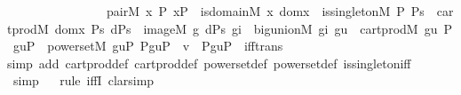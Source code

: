 \begin{isabellebody}
\ \ \ \ \ \ \ \ \ \ \ \ \ \ \ \ pair{\isacharparenleft}{\kern0pt}{\isacharhash}{\kern0pt}{\isacharhash}{\kern0pt}M{\isacharcomma}{\kern0pt}\ x{\isacharcomma}{\kern0pt}\ P{\isacharcomma}{\kern0pt}\ xP{\isacharparenright}{\kern0pt}\ {\isasymand}\ is{\isacharunderscore}{\kern0pt}domain{\isacharparenleft}{\kern0pt}{\isacharhash}{\kern0pt}{\isacharhash}{\kern0pt}M{\isacharcomma}{\kern0pt}\ x{\isacharcomma}{\kern0pt}\ domx{\isacharparenright}{\kern0pt}\ {\isasymand}\ is{\isacharunderscore}{\kern0pt}singleton{\isacharparenleft}{\kern0pt}{\isacharhash}{\kern0pt}{\isacharhash}{\kern0pt}M{\isacharcomma}{\kern0pt}\ P{\isacharcomma}{\kern0pt}\ Ps{\isacharparenright}{\kern0pt}\ {\isasymand}\ cartprod{\isacharparenleft}{\kern0pt}{\isacharhash}{\kern0pt}{\isacharhash}{\kern0pt}M{\isacharcomma}{\kern0pt}\ domx{\isacharcomma}{\kern0pt}\ Ps{\isacharcomma}{\kern0pt}\ dPs{\isacharparenright}{\kern0pt}\ {\isasymand}\ image{\isacharparenleft}{\kern0pt}{\isacharhash}{\kern0pt}{\isacharhash}{\kern0pt}M{\isacharcomma}{\kern0pt}\ g{\isacharcomma}{\kern0pt}\ dPs{\isacharcomma}{\kern0pt}\ gi{\isacharparenright}{\kern0pt}\ {\isasymand}\ big{\isacharunderscore}{\kern0pt}union{\isacharparenleft}{\kern0pt}{\isacharhash}{\kern0pt}{\isacharhash}{\kern0pt}M{\isacharcomma}{\kern0pt}\ gi{\isacharcomma}{\kern0pt}\ gu{\isacharparenright}{\kern0pt}\ {\isasymand}\ cartprod{\isacharparenleft}{\kern0pt}{\isacharhash}{\kern0pt}{\isacharhash}{\kern0pt}M{\isacharcomma}{\kern0pt}\ gu{\isacharcomma}{\kern0pt}\ P{\isacharcomma}{\kern0pt}\ guP{\isacharparenright}{\kern0pt}\ {\isasymand}\ powerset{\isacharparenleft}{\kern0pt}{\isacharhash}{\kern0pt}{\isacharhash}{\kern0pt}M{\isacharcomma}{\kern0pt}\ guP{\isacharcomma}{\kern0pt}\ PguP{\isacharparenright}{\kern0pt}\ {\isasymand}\ v\ {\isasymin}\ PguP{\isachardoublequoteclose}\ \ iff{\isacharunderscore}{\kern0pt}trans{\isacharparenright}{\kern0pt}\isanewline
\ \ \isamarkupfalse%
{\isacharparenleft}{\kern0pt}simp\ add{\isacharcolon}{\kern0pt}\ cartprod{\isacharunderscore}{\kern0pt}def\ cartprod{\isacharprime}{\kern0pt}{\isacharunderscore}{\kern0pt}def\ powerset{\isacharunderscore}{\kern0pt}def\ powerset{\isacharprime}{\kern0pt}{\isacharunderscore}{\kern0pt}def\ is{\isacharunderscore}{\kern0pt}singleton{\isacharprime}{\kern0pt}{\isacharunderscore}{\kern0pt}iff{\isacharparenright}{\kern0pt}\isanewline
\ \ \isamarkupfalse%
\ simp\isanewline
\ \ \isamarkupfalse%
{\isacharparenleft}{\kern0pt}rule\ iffI{\isacharcomma}{\kern0pt}\ clarsimp{\isacharparenright}{\kern0pt}\isanewline
\ \ \isamarkupfalse%

\end{isabellebody}
